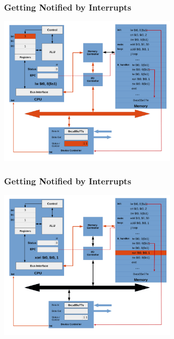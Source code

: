 \documentclass{beamer}
\begin{document}
\begin{frame}[fragile]
\frametitle{Getting Notified by Interrupts}

\begin{center}
\vspace*{-0.23cm}
\hspace*{-1cm}\includegraphics[width=8.7cm]{interrupt_waiting20.pdf}
\end{center}

\end{frame}

\begin{frame}[fragile]
\frametitle{Getting Notified by Interrupts}

\begin{center}
\vspace*{-0.23cm}
\hspace*{-1cm}\includegraphics[width=8.7cm]{interrupt_waiting21.pdf}
\end{center}

\end{frame}
\end{document}
